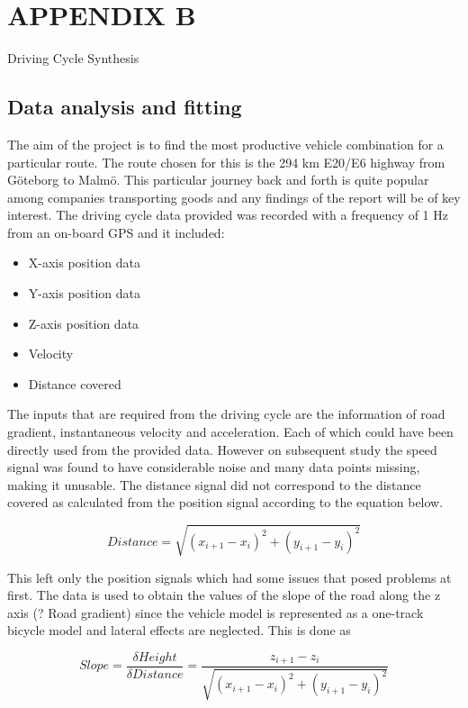 \documentclass[ExampleMasters.tex]{subfiles}
\begin{document}
	\chapter{APPENDIX B}
	{\Large Driving Cycle Synthesis}

	\section{Data analysis and fitting}

	The aim of the project is to find the most productive vehicle combination for a particular route. The route chosen for this is the 294 km E20/E6 highway from G\"oteborg to Malm\"o. This particular journey back and forth is quite popular among companies transporting goods and any findings of the report will be of key interest. 
	The driving cycle data provided was recorded with a frequency of 1 Hz from an on-board GPS and it included:
	\begin{itemize}
		\item X-axis position data
		\item Y-axis position data
		\item Z-axis position data
		\item Velocity
		\item Distance covered
	\end{itemize}

	The inputs that are required from the driving cycle are the information of road gradient, instantaneous velocity and acceleration. Each of which could have been directly used from the provided data. However on subsequent study the speed signal was found to have considerable noise and many data points missing, making it unusable. The distance signal did not correspond to the distance covered as calculated from the position signal according to the equation below.

	\begin{equation} \label{eq:cycle distance}
	Distance = \sqrt{(x_{i+1} - x_i)^2 +(y_{i+1} - y_i)^2}
	\end{equation}

	This left only the position signals which had some issues that posed problems at first. The data is used to obtain the values of the slope of the road along the z axis (? Road gradient) since the vehicle model is represented as a one-track bicycle model and lateral effects are neglected. This is done as 

	\begin{equation} \label{eq:cycle slope}
	Slope =\frac{\delta Height}{\delta Distance} = \frac{z_{i+1} - z_i}{\sqrt{(x_{i+1}-x_i)^2 +(y_{i+1}-y_i)^2  }}
	\end{equation}
\end{document}
